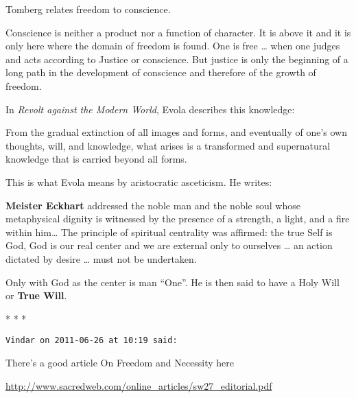 Tomberg relates freedom to conscience.

\begin{quotex}
Conscience is neither a product nor a function of character. It is above it and it is only here where the domain of freedom is found. One is free … when one judges and acts according to Justice or conscience. But justice is only the beginning of a long path in the development of conscience and therefore of the growth of freedom. 

\end{quotex}
In \emph{Revolt against the Modern World}, Evola describes this knowledge:

\begin{quotex}
From the gradual extinction of all images and forms, and eventually of one's own thoughts, will, and knowledge, what arises is a transformed and supernatural knowledge that is carried beyond all forms.

\end{quotex}
This is what Evola means by aristocratic asceticism. He writes:

\begin{quotex}
\textbf{Meister Eckhart} addressed the noble man and the noble soul whose metaphysical dignity is witnessed by the presence of a strength, a light, and a fire within him… The principle of spiritual centrality was affirmed: the true Self is God, God is our real center and we are external only to ourselves … an action dictated by desire … must not be undertaken.

\end{quotex}
Only with God as the center is man “One”. He is then said to have a Holy Will or \textbf{True Will}.


\begin{center}* * *\end{center}

\begin{footnotesize}\begin{sffamily}

\hfill

\texttt{Vindar on 2011-06-26 at 10:19 said:}

There's a good article On Freedom and Necessity here

\url{http://www.sacredweb.com/online\_articles/sw27\_editorial.pdf}

\hfill

\end{sffamily}\end{footnotesize}

